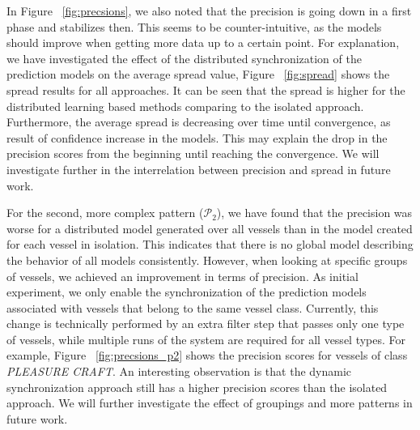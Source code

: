 \par In Figure ~\ref{fig:precsions}, we also noted that the precision is going down in a first phase and stabilizes then.  This seems to be counter-intuitive, as the models should improve when getting more data up to a certain point. For explanation, we have investigated the effect of the distributed synchronization of the prediction models on the average spread value, Figure  ~\ref{fig:spread}  shows the spread results for all approaches. It can be seen that the spread is higher for the distributed learning based methods comparing to the isolated approach. Furthermore, the average spread is decreasing over time until convergence, as result of confidence increase in the models. This may explain the drop in the precision scores from the beginning until reaching the convergence. We will investigate further in the interrelation between precision and spread in future work. 


\par For the second, more complex pattern ($\mathcal{P}_2$), we have found that the precision was worse for a distributed model generated over all vessels than in the model created for each vessel in isolation. This indicates that there is no  global model describing the behavior of all models consistently. However, when looking at specific groups of vessels, we achieved an improvement in terms of precision. As initial experiment, we only enable the synchronization of the prediction models associated with vessels that belong to the same vessel class. Currently, this change is technically performed by an extra filter step that passes only one type of vessels, while multiple runs of the system are required for all vessel types. For example, Figure ~\ref{fig:precsions_p2} shows the precision scores for vessels of class \textit{PLEASURE CRAFT}. An interesting observation is that the dynamic synchronization approach still has  a higher precision scores than the isolated approach. We will further investigate the effect of groupings and more patterns in future work.







